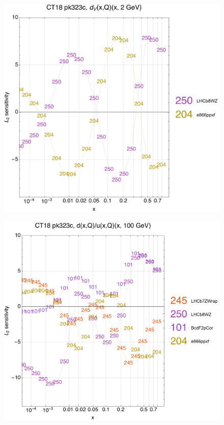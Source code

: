 \documentclass[10pt,aps,prd,floatfix,titlepage]{revtex4}
\begin{document}
\begin{figure}
\includegraphics[width=\textwidth,height=0.44\textheight,keepaspectratio]{2/rat_ifl2_ct18nn_L2_q2_Sf_2.pdf}
\caption{}
\end{figure}
\clearpage
\begin{figure}
\includegraphics[width=\textwidth,height=0.44\textheight,keepaspectratio]{2/rat_ifl3_ct18nn_L2_q100_Sf_2.pdf}
\caption{}
\end{figure}
\end{document}
